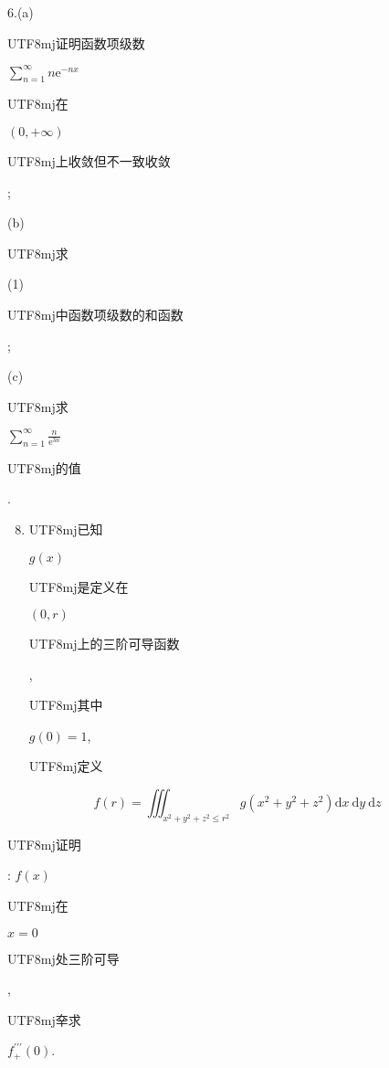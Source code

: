 \documentclass[10pt]{article}
\begin{document}
6.(a) \begin{CJK}{UTF8}{mj}证明函数项级数\end{CJK} $\sum_{n=1}^{\infty} n \mathrm{e}^{-n x}$ \begin{CJK}{UTF8}{mj}在\end{CJK} $(0,+\infty)$ \begin{CJK}{UTF8}{mj}上收敛但不一致收敛\end{CJK};

(b) \begin{CJK}{UTF8}{mj}求\end{CJK} (1) \begin{CJK}{UTF8}{mj}中函数项级数的和函数\end{CJK};

(c) \begin{CJK}{UTF8}{mj}求\end{CJK} $\sum_{n=1}^{\infty} \frac{n}{\mathrm{e}^{3 n}}$ \begin{CJK}{UTF8}{mj}的值\end{CJK}.

\begin{enumerate}
  \setcounter{enumi}{7}
  \item \begin{CJK}{UTF8}{mj}已知\end{CJK} $g(x)$ \begin{CJK}{UTF8}{mj}是定义在\end{CJK} $(0, r)$ \begin{CJK}{UTF8}{mj}上的三阶可导函数\end{CJK}, \begin{CJK}{UTF8}{mj}其中\end{CJK} $g(0)=1$, \begin{CJK}{UTF8}{mj}定义\end{CJK}
\end{enumerate}
$$
f(r)=\iiint_{x^{2}+y^{2}+z^{2} \leq r^{2}} g\left(x^{2}+y^{2}+z^{2}\right) \mathrm{d} x \mathrm{~d} y \mathrm{~d} z
$$
\begin{CJK}{UTF8}{mj}证明\end{CJK}: $f(x)$ \begin{CJK}{UTF8}{mj}在\end{CJK} $x=0$ \begin{CJK}{UTF8}{mj}处三阶可导\end{CJK}, \begin{CJK}{UTF8}{mj}㚔求\end{CJK} $f_{+}^{\prime \prime \prime}(0)$.
\end{document}
